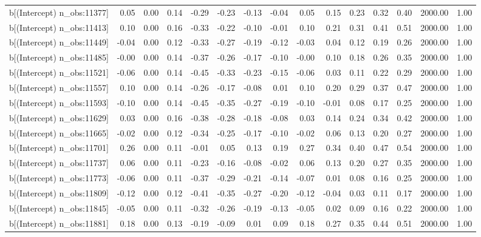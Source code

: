 \begin{table}[ht]
\begin{tabular}{rrrrrrrrrrrrrrr}
  b[(Intercept) n\_obs:11377] & 0.05 & 0.00 & 0.14 & -0.29 & -0.23 & -0.13 & -0.04 & 0.05 & 0.15 & 0.23 & 0.32 & 0.40 & 2000.00 & 1.00 \\ 
  b[(Intercept) n\_obs:11413] & 0.10 & 0.00 & 0.16 & -0.33 & -0.22 & -0.10 & -0.01 & 0.10 & 0.21 & 0.31 & 0.41 & 0.51 & 2000.00 & 1.00 \\ 
  b[(Intercept) n\_obs:11449] & -0.04 & 0.00 & 0.12 & -0.33 & -0.27 & -0.19 & -0.12 & -0.03 & 0.04 & 0.12 & 0.19 & 0.26 & 2000.00 & 1.00 \\ 
  b[(Intercept) n\_obs:11485] & -0.00 & 0.00 & 0.14 & -0.37 & -0.26 & -0.17 & -0.10 & -0.00 & 0.10 & 0.18 & 0.26 & 0.35 & 2000.00 & 1.00 \\ 
  b[(Intercept) n\_obs:11521] & -0.06 & 0.00 & 0.14 & -0.45 & -0.33 & -0.23 & -0.15 & -0.06 & 0.03 & 0.11 & 0.22 & 0.29 & 2000.00 & 1.00 \\ 
  b[(Intercept) n\_obs:11557] & 0.10 & 0.00 & 0.14 & -0.26 & -0.17 & -0.08 & 0.01 & 0.10 & 0.20 & 0.29 & 0.37 & 0.47 & 2000.00 & 1.00 \\ 
  b[(Intercept) n\_obs:11593] & -0.10 & 0.00 & 0.14 & -0.45 & -0.35 & -0.27 & -0.19 & -0.10 & -0.01 & 0.08 & 0.17 & 0.25 & 2000.00 & 1.00 \\ 
  b[(Intercept) n\_obs:11629] & 0.03 & 0.00 & 0.16 & -0.38 & -0.28 & -0.18 & -0.08 & 0.03 & 0.14 & 0.24 & 0.34 & 0.42 & 2000.00 & 1.00 \\ 
  b[(Intercept) n\_obs:11665] & -0.02 & 0.00 & 0.12 & -0.34 & -0.25 & -0.17 & -0.10 & -0.02 & 0.06 & 0.13 & 0.20 & 0.27 & 2000.00 & 1.00 \\ 
  b[(Intercept) n\_obs:11701] & 0.26 & 0.00 & 0.11 & -0.01 & 0.05 & 0.13 & 0.19 & 0.27 & 0.34 & 0.40 & 0.47 & 0.54 & 2000.00 & 1.00 \\ 
  b[(Intercept) n\_obs:11737] & 0.06 & 0.00 & 0.11 & -0.23 & -0.16 & -0.08 & -0.02 & 0.06 & 0.13 & 0.20 & 0.27 & 0.35 & 2000.00 & 1.00 \\ 
  b[(Intercept) n\_obs:11773] & -0.06 & 0.00 & 0.11 & -0.37 & -0.29 & -0.21 & -0.14 & -0.07 & 0.01 & 0.08 & 0.16 & 0.25 & 2000.00 & 1.00 \\ 
  b[(Intercept) n\_obs:11809] & -0.12 & 0.00 & 0.12 & -0.41 & -0.35 & -0.27 & -0.20 & -0.12 & -0.04 & 0.03 & 0.11 & 0.17 & 2000.00 & 1.00 \\ 
  b[(Intercept) n\_obs:11845] & -0.05 & 0.00 & 0.11 & -0.32 & -0.26 & -0.19 & -0.13 & -0.05 & 0.02 & 0.09 & 0.16 & 0.22 & 2000.00 & 1.00 \\ 
  b[(Intercept) n\_obs:11881] & 0.18 & 0.00 & 0.13 & -0.19 & -0.09 & 0.01 & 0.09 & 0.18 & 0.27 & 0.35 & 0.44 & 0.51 & 2000.00 & 1.00 \\ 

\end{tabular}
\end{table}
